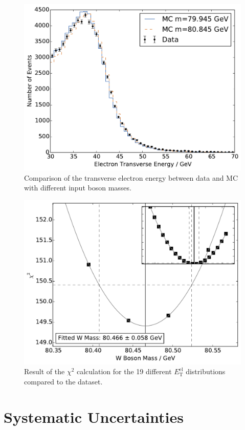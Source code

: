\documentclass[
	paper=A4,
	parskip=full,
	chapterprefix=true,
	12pt,
	headings=normal,
	bibliography=totoc,
	listof=totoc,
	titlepage=on,
]{scrreprt}
\newcommand{\ELET}{\ensuremath{{E_\mathrm{T}^\mathrm{el}}}\xspace}
\begin{document}
\begin{figure}
	\centering
	\includegraphics{comparison_el_e_t}
	\caption{Comparison of the transverse electron energy between data and MC with different input \PW boson masses.}
	\label{fig:comparison_el_et}
\end{figure}


\begin{figure}
	\centering
	\includegraphics{chisquare_el_e_t}
	\caption{Result of the $\chi^2$ calculation for the 19 different \ELET distributions compared to the dataset.}
	\label{fig:chisquare_el_et}
\end{figure}

\section{Systematic Uncertainties}
\end{document}
